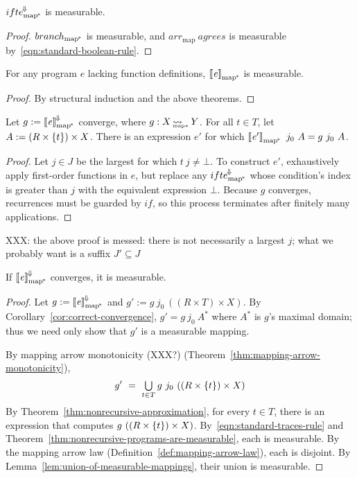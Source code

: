 \documentclass[preprint]{sigplanconf}
\newcommand{\arrow}{\rightsquigarrow}
\newcommand{\conv}{^{\mspace{-2mu}\Downarrow\mspace{-2mu}}}
\newcommand{\meaningofconv}[1]{\left\llbracket{#1}\right\rrbracket\conv}
\newcommand{\arrowarr}{\ensuremath{arr}}
\newcommand{\arrowconvif}{\ensuremath{ifte\conv}}
\newcommand{\map}{_\mathrm{map}}
\newcommand{\arrmap}{\arrowarr\map}
\newcommand{\pmap}{_\mathrm{map^{\mspace{-2mu}*}}}
\DeclareMathOperator{\pmapto}{\arrow_{\mspace{-22mu}_{\mathrm{map*}}}}
\newcommand{\convifpmap}{\arrowconvif\pmap}
\begin{document}
\begin{theorem}
$\convifpmap$ is measurable.
\end{theorem}
\begin{proof}
$branch\pmap$ is measurable, and $\arrmap~agrees$ is measurable by~\eqref{eqn:standard-boolean-rule}.
\end{proof}

\begin{theorem}
For any program $\mathit{e}$ lacking function definitions, $\meaningof{\mathit{e}}\pmap$ is measurable.
\label{thm:nonrecursive-programs-are-measurable}
\end{theorem}
\begin{proof}
By structural induction and the above theorems.
\end{proof}

\begin{theorem}
Let $g := \meaningofconv{\mathit{e}}\pmap$ converge, where $g : X \pmapto Y$.
For all $t \in T$, let $A := (R \times \{{t}\}) \times X$.
There is an expression $\mathit{e'}$ for which $\meaningof{\mathit{e'}}\pmap~j_0~A = g~j_0~A$.
\label{thm:nonrecursive-approximation}
\end{theorem}
\begin{proof}
Let $j \in J$ be the largest for which $t~j \neq \bot$.
To construct $\mathit{e'}$, exhaustively apply first-order functions in $\mathit{e}$, but replace any $\convifpmap$ whose condition's index is greater than $j$ with the equivalent expression $\bot$.
Because $g$ converges, recurrences must be guarded by $if$, so this process terminates after finitely many applications.
\end{proof}

XXX: the above proof is messed: there is not necessarily a largest $j$; what we probably want is a suffix $J' \subseteq J$

\begin{theorem}
If $\meaningofconv{\mathit{e}}\pmap$ converges, it is measurable.
\label{thm:everything-is-measurable}
\end{theorem}
\begin{proof}
Let $g := \meaningofconv{\mathit{e}}\pmap$ and $g' := g~j_0~((R \times T) \times X)$.
By Corollary~\ref{cor:correct-convergence}, $g' = g~j_0~A^*$ where $A^*$ is $g$'s maximal domain; thus we need only show that $g'$ is a measurable mapping.

By mapping arrow monotonicity (XXX?) (Theorem~\ref{thm:mapping-arrow-monotonicity}),
\begin{equation}
	g' \ =\ \textstyle\bigcup\limits_{t \in T} g~j_0~((R \times \{{t}\}) \times X)
\end{equation}
By Theorem~\ref{thm:nonrecursive-approximation}, for every $t \in T$, there is an expression that computes $g~((R \times \{{t}\}) \times X)$.
By~\eqref{eqn:standard-traces-rule} and Theorem~\ref{thm:nonrecursive-programs-are-measurable}, each is measurable.
By the mapping arrow law (Definition~\ref{def:mapping-arrow-law}), each is disjoint.
By Lemma~\ref{lem:union-of-measurable-mappings}, their union is measurable.
\end{proof}
\end{document}
